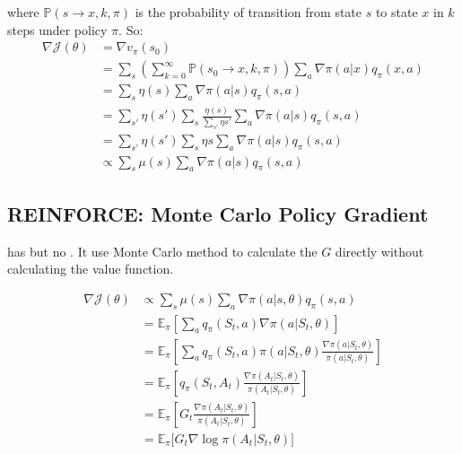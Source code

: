 where $\mathbb{P}(s \rightarrow x, k, \pi )$ is the probability of transition from state $s$ to state $x$ in $k$ steps under policy $\pi$. So:
\begin{equation}
	\begin{aligned}
		\nabla \mathcal{J}(\theta ) &= \nabla v_\pi(s_0) \\
		&= \sum_{s} \left( \sum_{k=0}^\infty \mathbb{P}(s_0 \rightarrow x, k, \pi ) \right) \sum_a \nabla \pi(a|x) q_\pi(x,a) \\
		&= \sum_s \eta(s) \sum_a \nabla \pi(a|s) q_\pi(s,a) \\
		&= \sum_{s'} \eta(s') \sum_s \frac{\eta(s)}{\sum_{s'} \eta{s'}} \sum_a \nabla \pi(a|s) q_\pi(s,a) \\
		&= \sum_{s'} \eta(s') \sum_s \eta{s} \sum_a \nabla \pi(a|s) q_\pi(s,a) \\
		&\propto \sum_s \mu(s) \sum_a \nabla \pi(a|s) q_\pi(s,a)
	\end{aligned}
\end{equation}

\subsection{REINFORCE: Monte Carlo Policy Gradient}

 has  but no . It use Monte Carlo method to calculate the $G$ directly without calculating the value function.

\begin{equation}
	\begin{aligned}
		\nabla \mathcal{J}(\theta ) &\propto \sum_s \mu(s) \sum_a \nabla \pi(a|s,\mathbb{\theta} ) q_\pi(s,a) \\
		&= \mathbb{E}_\pi \left[ \sum_a q_\pi(S_t,a) \nabla \pi(a|S_t,\mathbb{\theta}) \right] \\
		&= \mathbb{E}_\pi \left[ \sum_a q_\pi(S_t,a) \pi(a|S_t,\theta) \frac{\nabla \pi(a|S_t,\mathbb{\theta})}{\pi(a|S_t,\mathbb{\theta})} \right] \\
		&= \mathbb{E}_\pi \left[ q_\pi(S_t,A_t) \frac{\nabla \pi(A_t|S_t,\mathbb{\theta})}{\pi(A_t|S_t,\mathbb{\theta})} \right] \\
		&= \mathbb{E}_\pi \left[ G_t \frac{\nabla \pi(A_t|S_t,\mathbb{\theta})}{\pi(A_t|S_t,\mathbb{\theta})} \right] \\
		&= \mathbb{E}_\pi \Big[ G_t \nabla \log \pi(A_t|S_t,\mathbb{\theta}) \Big] 
	\end{aligned}
\end{equation}

